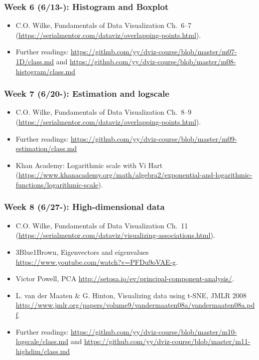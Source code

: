 \subsubsection{Week 6 (6/13-): Histogram and Boxplot }%

\begin{itemize}\itemsep0em 
\item C.O. Wilke, Fundamentals of Data Visualization Ch.~6--7 (\url{https://serialmentor.com/dataviz/overlapping-points.html}). 
\item Further readings: \url{https://github.com/yy/dviz-course/blob/master/m07-1D/class.md} and \url{https://github.com/yy/dviz-course/blob/master/m08-histogram/class.md}
\end{itemize}	
\subsubsection{Week 7 (6/20-): Estimation and logscale }%

\begin{itemize}\itemsep0em 
\item C.O. Wilke, Fundamentals of Data Visualization Ch.~8--9 (\url{https://serialmentor.com/dataviz/overlapping-points.html}). 
\item Further readings: \url{https://github.com/yy/dviz-course/blob/master/m09-estimation/class.md}
\item Khan Academy: Logarithmic scale with Vi Hart (\url{https://www.khanacademy.org/math/algebra2/exponential-and-logarithmic-functions/logarithmic-scale}). 
\end{itemize}	
\subsubsection{Week 8 (6/27-): High-dimensional data }%

\begin{itemize}\itemsep0em 
\item C.O. Wilke, Fundamentals of Data Visualization Ch.~11 (\url{https://serialmentor.com/dataviz/visualizing-associations.html}). 
\item 3Blue1Brown, Eigenvectors and eigenvalues \url{https://www.youtube.com/watch?v=PFDu9oVAE-g}. 
\item Victor Powell, PCA \url{http://setosa.io/ev/principal-component-analysis/}.
\item L. van der Maaten \& G. Hinton, Visualizing data using t-SNE, JMLR 2008 \url{http://www.jmlr.org/papers/volume9/vandermaaten08a/vandermaaten08a.pdf}.
\item Further readings: \url{https://github.com/yy/dviz-course/blob/master/m10-logscale/class.md} and \url{https://github.com/yy/dviz-course/blob/master/m11-highdim/class.md}
\end{itemize}	

